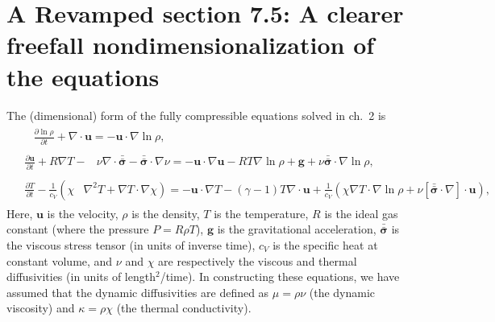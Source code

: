 \documentclass[aps, pre, onecolumn, nofootinbib, notitlepage, groupedaddress, amsfonts, amssymb, amsmath, longbibliography, superscriptaddress]{revtex4-1}
\newcommand{\grad}{\ensuremath{\nabla}}
\newcommand{\lilstressT}{\ensuremath{\bm{\bar{\bar{\sigma}}}}}
\begin{document}
\section{A Revamped section 7.5: A clearer freefall nondimensionalization of the equations}
\label{sec:freefall_nondim}
The (dimensional) form of the fully compressible equations solved in ch.~2 is 
\begin{align}
&\begin{aligned}
&\frac{\partial \ln\rho}{\partial t} + \grad\cdot\bm{u} 
    = -\bm{u}\cdot\grad\ln\rho,
	\label{eqn:ab17continuity_eqn}
\end{aligned}\\
&\begin{aligned}
\frac{\partial\bm{u}}{\partial t} + R \grad T - 
&\nu\grad\cdot\lilstressT - \lilstressT\cdot\grad\nu =
-\bm{u}\cdot\grad\bm{u} - RT\grad\ln\rho + \bm{g} + 
\nu\lilstressT\cdot\grad\ln\rho,
\label{eqn:ab17momentum_eqn}
\end{aligned}\\
&\begin{aligned}
\frac{\partial T}{\partial t} -\frac{1}{c_V}\left(\right.\chi&\left.
    \grad^2 T + \grad T\cdot\grad\chi\right) =
	-\bm{u}\cdot\grad T - (\gamma-1)T\grad\cdot{\bm{u}}
	+ \frac{1}{c_V}\left(\chi\grad T \cdot\grad\ln\rho +
	\nu\left[\lilstressT\cdot\nabla\right]\cdot\bm{u}\right), 
	\label{eqn:ab17energy_eqn}
\end{aligned}
\end{align}
Here, $\bm{u}$ is the velocity, $\rho$ is the density, $T$ is the temperature, $R$ is the ideal gas constant (where the pressure $P = R\rho T$), $\bm{g}$ is the gravitational acceleration, $\lilstressT$ is the viscous stress tensor (in units of inverse time), $c_V$ is the specific heat at constant volume, and $\nu$ and $\chi$ are respectively the viscous and thermal diffusivities (in units of length$^2$/time).
In constructing these equations, we have assumed that the dynamic diffusivities are defined as $\mu = \rho \nu$ (the dynamic viscosity) and $\kappa = \rho \chi$ (the thermal conductivity).
\end{document}
